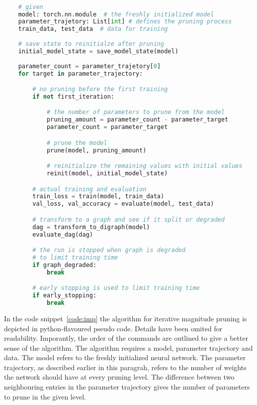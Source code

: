 \begin{minipage}{\linewidth}
\begin{lstlisting}[language=Python,caption={This code snippet contains python-flavoured pseudo code.
    It depicts the general procedure of iterative magnitude pruning used for the experiments in this thesis.},captionpos=b, label={code:imp}]

    # given
    model: torch.nn.module  # the freshly initialized model 
    parameter_trajetory: List[int] # defines the pruning process
    train_data, test_data  # data for training
    
    # save state to reinitialze after pruning
    initial_model_state = save_model_state(model)
    
    parameter_count = parameter_trajetory[0]
    for target in parameter_trajectory:

        # no pruning before the first training
        if not first_iteration:

            # the number of parameters to prune from the model
            pruning_amount = parameter_count - parameter_target
            parameter_count = parameter_target

            # prune the model 
            prune(model, pruning_amount)

            # reinitialize the remaining values with initial values
            reinit(model, initial_model_state)

        # actual training and evaluation
        train_loss = train(model, train_data)
        val_loss, val_accuracy = evaluate(model, test_data)

        # transform to a graph and see if it split or degraded
        dag = transform_to_digraph(model)
        evaluate_dag(dag)

        # the run is stopped when graph is degraded 
        # to limit training time
        if graph_degraded:
            break

        # early stopping is used to limit training time
        if early_stopping:
            break
    \end{lstlisting}
\end{minipage}

In the code snippet~\ref{code:imp} the algorithm for iterative magnitude pruning is depicted in python-flavoured pseudo code.
Details have been omited for readability.
Imporantly, the order of the commands are outlined to give a better sense of the algorithm.
The algorithm requires a model, parameter trajectory and data.
The model refers to the freshly initialized neural network.
The parameter trajectory, as described earlier in this paragrah, refers to the number of weights the network should have at every pruning level.
The difference between two neighbouring entries in the parameter trajectory gives the number of parameters to prune in the given level.

